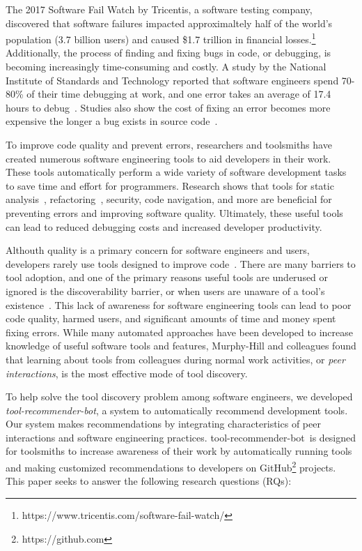 \documentclass[conference]{IEEEtran}
\newcommand{\tool}{tool-recommender-bot}
\begin{document}
The 2017 Software Fail Watch by Tricentis, a software testing company, discovered that software failures impacted approximaltely half of the world's population (3.7 billion users) and caused \$1.7 trillion in financial losses.\footnote{https://www.tricentis.com/software-fail-watch/} Additionally, the process of finding and fixing bugs in code, or debugging, is becoming increasingly time-consuming and costly.  A study by the National Institute of Standards and Technology reported that software engineers spend 70-80\% of their time debugging at work, and one error takes an average of 17.4 hours to debug~\cite{NIST}. Studies also show the cost of fixing an error becomes more expensive the longer a bug exists in source code~\cite{SEEconomics, SoftwareAssuranceSDLC}.

To improve code quality and prevent errors, researchers and toolsmiths have created numerous software engineering tools to aid developers in their work. These tools automatically perform a wide variety of software development tasks to save time and effort for programmers. Research shows that tools for static analysis~\cite{UsingStaticAnalysis}, refactoring~\cite{Murphy-HillFitness}, security, code navigation, and more are beneficial for preventing errors and improving software quality. Ultimately, these useful tools can lead to reduced debugging costs and increased developer productivity.

Althouth quality is a primary concern for software engineers and users, developers rarely use tools designed to improve code~\cite{Johnson2013Why}. There are many barriers to tool adoption, and one of the primary reasons useful tools are underused or ignored is the discoverability barrier, or when users are unaware of a tool's existence~\cite{Murphy-HillScreencastingDiscovery}. This lack of awareness for software engineering tools can lead to poor code quality, harmed users, and significant amounts of time and money spent fixing errors. While many automated approaches have been developed to increase knowledge of useful software tools and features, Murphy-Hill and colleagues found that learning about tools from colleagues during normal work activities, or \textit{peer interactions}, is the most effective mode of tool discovery\cite{MurphyHill2011PeerInteraction}.

To help solve the tool discovery problem among software engineers, we developed \textit{\tool}, a system to automatically recommend development tools. Our system makes recommendations by integrating characteristics of peer interactions and software engineering practices. \tool~is designed for toolsmiths to increase awareness of their work by automatically running tools and making customized recommendations to developers on GitHub\footnote{https://github.com} projects. This paper seeks to answer the following research questions (RQs): \\
\end{document}
